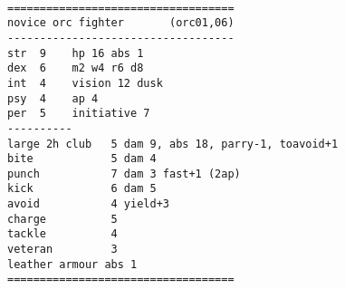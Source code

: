 \

\goodbreak \begin{samepage} \small \begin{verbatim}
===================================
novice orc fighter       (orc01,06)
-----------------------------------
str  9    hp 16 abs 1
dex  6    m2 w4 r6 d8
int  4    vision 12 dusk
psy  4    ap 4
per  5    initiative 7
----------
large 2h club   5 dam 9, abs 18, parry-1, toavoid+1
bite           	5 dam 4
punch          	7 dam 3 fast+1 (2ap)
kick            6 dam 5 
avoid          	4 yield+3
charge         	5
tackle         	4
veteran        	3
leather armour abs 1
===================================
\end{verbatim} \normalsize \end{samepage}










